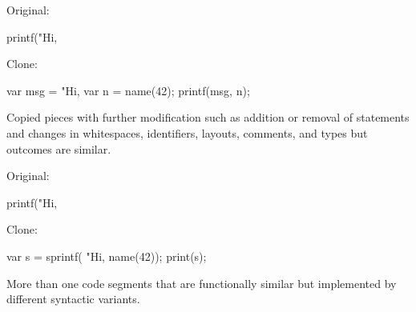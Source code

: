 \documentclass{article}
\begin{document}
\begin{multicols}{2}
Original:\par
{\small\begin{ffcode}
printf("Hi, %
\end{ffcode}
}
Clone:\par
{\small\begin{ffcode}
var msg = "Hi, %
var n = name(42);
printf(msg, n);
\end{ffcode}
}
\par\columnbreak\par
Copied pieces with further modification such as addition or removal of statements and changes in whitespaces, identifiers, layouts, comments, and types but outcomes are similar.
\end{multicols}
\plush{}

\begin{multicols}{2}
Original:\par
{\small\begin{ffcode}
printf("Hi, %
\end{ffcode}
}
Clone:\par
{\small\begin{ffcode}
var s = sprintf(
  "Hi, %
  name(42));
print(s);
\end{ffcode}
}
\par\columnbreak\par
More than one code segments that are functionally similar but implemented by different syntactic variants.
\end{multicols}
\plush{}


\end{document}

